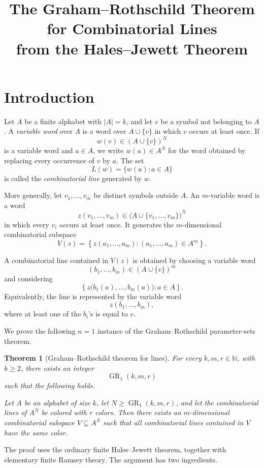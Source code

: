 \documentclass[11pt]{article}
\title{The Graham--Rothschild Theorem for Combinatorial Lines\\
from the Hales--Jewett Theorem}
\author{}
\date{}
\newtheorem{theorem}{Theorem}[section]
\newcommand{\N}{\mathbb N}
\begin{document}
\maketitle

\section{Introduction}

Let \(A\) be a finite alphabet with \(|A|=k\), and let \(v\) be a symbol
not belonging to \(A\). A \emph{variable word} over \(A\) is a word over
\(A\cup\{v\}\) in which \(v\) occurs at least once. If
\[
  w(v)\in (A\cup\{v\})^N
\]
is a variable word and \(a\in A\), we write \(w(a)\in A^N\) for the word
obtained by replacing every occurrence of \(v\) by \(a\). The set
\[
  L(w)=\{w(a):a\in A\}
\]
is called the \emph{combinatorial line} generated by \(w\).

More generally, let \(v_1,\dots,v_m\) be distinct symbols outside \(A\).
An \(m\)-variable word is a word
\[
  z(v_1,\dots,v_m)\in
  \bigl(A\cup\{v_1,\dots,v_m\}\bigr)^N
\]
in which every \(v_i\) occurs at least once. It generates the
\(m\)-dimensional combinatorial subspace
\[
  V(z)
  =
  \left\{
    z(a_1,\dots,a_m):
    (a_1,\dots,a_m)\in A^m
  \right\}.
\]

A combinatorial line contained in \(V(z)\) is obtained by choosing a
variable word
\[
  (b_1,\dots,b_m)\in (A\cup\{v\})^m
\]
and considering
\[
  \left\{
    z\bigl(b_1(a),\dots,b_m(a)\bigr):a\in A
  \right\}.
\]
Equivalently, the line is represented by the variable word
\[
  z(b_1,\dots,b_m),
\]
where at least one of the \(b_i\)'s is equal to \(v\).

We prove the following \(n=1\) instance of the Graham--Rothschild
parameter-sets theorem.

\begin{theorem}[Graham--Rothschild theorem for lines]
  \label{thm:GR-lines}
  For every \(k,m,r\in\N\), with \(k\geq 2\), there exists an integer
  \[
    \operatorname{GR}_1(k,m,r)
  \]
  such that the following holds.

  Let \(A\) be an alphabet of size \(k\), let
  \(N\geq \operatorname{GR}_1(k,m,r)\), and let the combinatorial lines
  of \(A^N\) be colored with \(r\) colors. Then there exists an
  \(m\)-dimensional combinatorial subspace \(V\subseteq A^N\) such that
  all combinatorial lines contained in \(V\) have the same color.
\end{theorem}

The proof uses the ordinary finite Hales--Jewett theorem, together with
elementary finite Ramsey theory. The argument has two ingredients.
\end{document}
